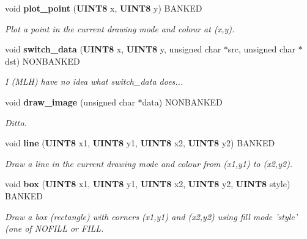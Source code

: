 \begin{CompactItemize}
\item 
\label{drawing.h_a19}
void {\bf plot\_\-point} ({\bf UINT8} x, {\bf UINT8} y) BANKED
\begin{CompactList}\small\item\em Plot a point in the current drawing mode and colour at (x,y).\item\end{CompactList}

\item 
\label{drawing.h_a20}
void {\bf switch\_\-data} ({\bf UINT8} x, {\bf UINT8} y, unsigned char $\ast$src, unsigned char $\ast$dst) NONBANKED
\begin{CompactList}\small\item\em I (MLH) have no idea what switch\_\-data does...\item\end{CompactList}

\item 
\label{drawing.h_a21}
void {\bf draw\_\-image} (unsigned char $\ast$data) NONBANKED
\begin{CompactList}\small\item\em Ditto.\item\end{CompactList}

\item 
\label{drawing.h_a22}
void {\bf line} ({\bf UINT8} x1, {\bf UINT8} y1, {\bf UINT8} x2, {\bf UINT8} y2) BANKED
\begin{CompactList}\small\item\em Draw a line in the current drawing mode and colour from (x1,y1) to (x2,y2).\item\end{CompactList}

\item 
\label{drawing.h_a23}
void {\bf box} ({\bf UINT8} x1, {\bf UINT8} y1, {\bf UINT8} x2, {\bf UINT8} y2, {\bf UINT8} style) BANKED
\begin{CompactList}\small\item\em Draw a box (rectangle) with corners (x1,y1) and (x2,y2) using fill mode 'style' (one of NOFILL or FILL.\item\end{CompactList}


\end{CompactItemize}
